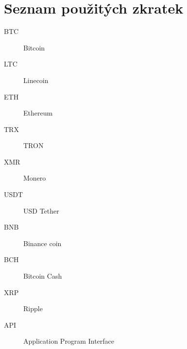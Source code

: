 \documentclass[thesis=B,czech]{FITthesis}[2019/03/21]
\begin{document}



\appendix

\chapter{Seznam použitých zkratek}
\begin{description}
	\item[BTC] Bitcoin
	\item[LTC] Linecoin
	\item[ETH] Ethereum
	\item[TRX] TRON
	\item[XMR] Monero
	\item[USDT] USD Tether
	\item[BNB] Binance coin
	\item[BCH] Bitcoin Cash
	\item[XRP] Ripple
	\item[API] Application Program Interface
\end{description}
\end{document}
